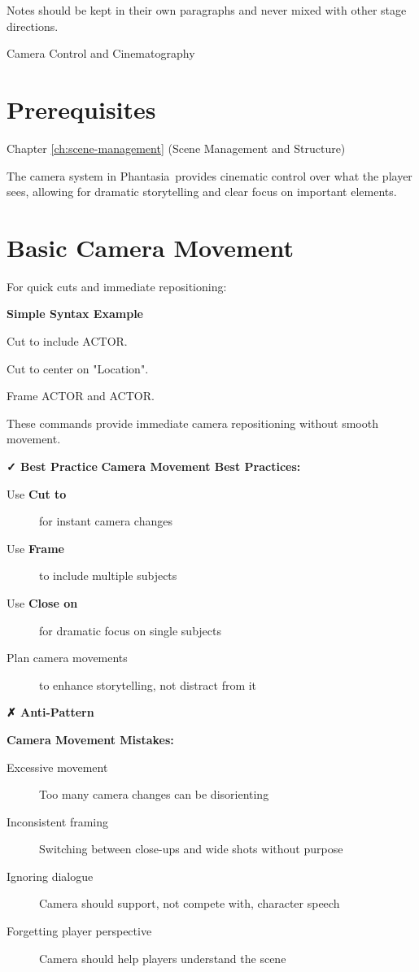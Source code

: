 \documentclass[11pt,letterpaper,oldstylefigures]{memoir}
\makeatletter
\newcommand{\stagedir}[1]{#1\par\vspace{1\baselineskip}}
\newenvironment{FountainExample}
  {\begingroup
  \ttfamily\small
   \setlength{\parindent}{0pt}
  \setlength{\parskip}{0.5em}
  \allowdisplaybreaks
  \setlength{\displaywidowpenalty}{0}
  \setlength{\widowpenalty}{0}
  \setlength{\clubpenalty}{0}
  \setlength{\interlinepenalty}{0}
}
  {\endgroup}
\newenvironment{AntiPattern}
{\begingroup
\small
\setlength{\parindent}{0pt}
\setlength{\parskip}{0.5em}
\allowdisplaybreaks
\setlength{\displaywidowpenalty}{0}
\setlength{\widowpenalty}{0}
\setlength{\clubpenalty}{0}
\setlength{\interlinepenalty}{0}
\begin{tcolorbox}[
    colback=red!5,
    colframe=red!75!black,
    boxrule=0.5pt,
    arc=2pt,
    left=0.5em,
    right=0.5em,
    top=0.25em,
    bottom=0.25em
]
\textbf{✗ Anti-Pattern}
\end{tcolorbox}\par
}
{\endgroup}
\newenvironment{SimpleExample}
{\begingroup
\small
\setlength{\parindent}{0pt}
\setlength{\parskip}{0.5em}
\allowdisplaybreaks
\setlength{\displaywidowpenalty}{0}
\setlength{\widowpenalty}{0}
\setlength{\clubpenalty}{0}
\setlength{\interlinepenalty}{0}
\begin{tcolorbox}[
    colback=blue!5,
    colframe=blue!75!black,
    boxrule=0.5pt,
    arc=2pt,
    left=0.5em,
    right=0.5em,
    top=0.25em,
    bottom=0.25em
]
\textbf{Simple Syntax Example}
\end{tcolorbox}\par
}
{\endgroup}
\let\oldchapter\chapter
\def\chapter{%
  \@ifstar
    {\FountainScripting@starchapter}%
    {\@dblarg\FountainScripting@chapter}}
\def\FountainScripting@starchapter#1{\oldchapter*{#1}\chaptermark{#1}}
\def\FountainScripting@chapter[#1]#2{\oldchapter[#1]{#2}\chaptermark{#2}}
\newcommand{\sectionbreak}{\newpage}
\newcommand{\paragraphbreak}{\vspace{0.5em}}
\newcommand{\fountain}[1]{\textbf{#1}}
\newcommand{\Phantasia}{{\irishfont Phantasia}}
\makeatother
\begin{document}
Notes should be kept in their own paragraphs and never mixed with other stage directions.

\chapter{Camera Control and Cinematography}
\label{ch:camera}
\sectionbreak

\section{Prerequisites}
Chapter \ref{ch:scene-management} (Scene Management and Structure)

The camera system in \Phantasia\ provides cinematic control over what the player sees, allowing for dramatic storytelling and clear focus on important elements.

\section{Basic Camera Movement}
\paragraphbreak

For quick cuts and immediate repositioning:

\begin{SimpleExample}
\begin{FountainExample}
\stagedir{Cut to include ACTOR.}
\stagedir{Cut to center on "Location".}
\stagedir{Frame ACTOR and ACTOR.}
\end{FountainExample}
\end{SimpleExample}

These commands provide immediate camera repositioning without smooth movement.

\textbf{✓ Best Practice}
\textbf{Camera Movement Best Practices:}
\begin{description}
\item[Use \fountain{Cut to}] for instant camera changes
\item[Use \fountain{Frame}] to include multiple subjects
\item[Use \fountain{Close on}] for dramatic focus on single subjects
\item[Plan camera movements] to enhance storytelling, not distract from it
\end{description}


\begin{AntiPattern}
\textbf{Camera Movement Mistakes:}
\begin{description}
\item[Excessive movement] Too many camera changes can be disorienting
\item[Inconsistent framing] Switching between close-ups and wide shots without purpose
\item[Ignoring dialogue] Camera should support, not compete with, character speech
\item[Forgetting player perspective] Camera should help players understand the scene
\end{description}
\end{AntiPattern}
\end{document}
